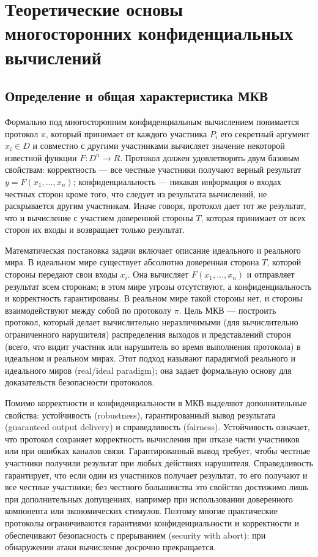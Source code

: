 \section{Теоретические основы многосторонних конфиденциальных вычислений}
\label{sec:theoretical-foundations}

\subsection{Определение и общая характеристика МКВ}

Формально под многосторонним конфиденциальным вычислением понимается протокол \(\pi\), который принимает от каждого участника \(P_{i}\) его секретный аргумент \(x_{i}\in D\) и совместно с другими участниками вычисляет значение некоторой известной функции \(F : D^{n}\to R\). Протокол должен удовлетворять двум базовым свойствам: корректность --- все честные участники получают верный результат \(y=F(x_{1},\ldots,x_{n})\); конфиденциальность --- никакая информация о входах честных сторон кроме того, что следует из результата вычислений, не раскрывается другим участникам. Иначе говоря, протокол дает тот же результат, что и вычисление с участием доверенной стороны \(T\), которая принимает от всех сторон их входы и возвращает только результат.

Математическая постановка задачи включает описание идеального и реального мира. В идеальном мире существует абсолютно доверенная сторона \(T\), которой стороны передают свои входы \(x_{i}\). Она вычисляет \(F(x_{1},\ldots,x_{n})\) и отправляет результат всем сторонам; в этом мире угрозы отсутствуют, а конфиденциальность и корректность гарантированы. В реальном мире такой стороны нет, и стороны взаимодействуют между собой по протоколу \(\pi\). Цель МКВ --- построить протокол, который делает вычислительно неразличимыми (для вычислительно ограниченного нарушителя) распределения выходов и представлений сторон (всего, что видит участник или нарушитель во время выполнения протокола) в идеальном и реальном мирах. Этот подход называют парадигмой реального и идеального миров (real/ideal paradigm); она задает формальную основу для доказательств безопасности протоколов.

Помимо корректности и конфиденциальности в МКВ выделяют дополнительные свойства: устойчивость (robustness), гарантированный вывод результата (guaranteed output delivery) и справедливость (fairness). Устойчивость означает, что протокол сохраняет корректность вычисления при отказе части участников или при ошибках каналов связи. Гарантированный вывод требует, чтобы честные участники получили результат при любых действиях нарушителя. Справедливость гарантирует, что если один из участников получает результат, то его получают и все честные участники; без честного большинства это свойство достижимо лишь при дополнительных допущениях, например при использовании доверенного компонента или экономических стимулов. Поэтому многие практические протоколы ограничиваются гарантиями конфиденциальности и корректности и обеспечивают безопасность с прерыванием (security with abort): при обнаружении атаки вычисление досрочно прекращается.


